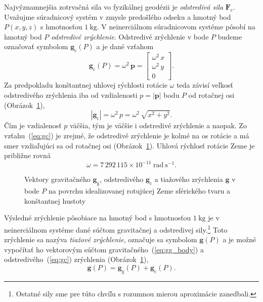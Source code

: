\documentclass[a4paper, 12pt]{book}
\newcommand{\gidx}{\mathrm g}
\newcommand{\cidx}{\mathrm c}
\let\vec\mathbf
\begin{document}
Najvýznamnejšia zotrvačná sila vo fyzikálnej geodézii je \emph{odstredivá sila} 
$\vec F_\cidx$.  Uvažujme súradnicový systém v zmysle predošlého odseku 
a hmotný bod $P(x, y, z)$ s hmotnosťou $1\ \mathrm{kg}$.  V neinerciálnom 
súradnicovom systéme pôsobí na hmotný bod $P$ \emph{odstredivé zrýchlenie}.  
Odstredivé zrýchlenie v bode $P$ budeme označovať symbolom $\vec g_\cidx(P)$ 
a je dané vzťahom
%
\begin{equation}
\label{eq:gc}
\vec g_\cidx(P) = \omega^2 \, \vec p =
%
\begin{bmatrix}
\omega^2 \, x\\
\omega^2 \, y\\
0
\end{bmatrix}
{.}
\end{equation}
%
Za predpokladu konštantnej uhlovej rýchlosti rotácie $\omega$ teda závisí 
veľkosť odstredivého zrýchlenia iba od vzdialenosti $p = | \vec p |$ bodu $P$ 
od rotačnej osi (Obrázok~\ref{fig:gravity_vector}),
%
\begin{equation}
| \vec g_\cidx | = \omega^2 \, p = \omega^2 \, \sqrt{x^2 + y^2}{.}
\end{equation}
%
Čím je vzdialenosť $p$ väčšia, tým je väčšie i odstredivé zrýchlenie a naopak.  
Zo vzťahu~(\ref{eq:gc}) je zrejmé, že odstredivé zrýchlenie je kolmé na os 
rotácie a má smer vzdiaľujúci sa od rotačnej osi 
(Obrázok~\ref{fig:gravity_vector}).  Uhlová rýchlosť rotácie Zeme je približne 
rovná \citep{GRS80}
%
\begin{equation}
\omega = 7\, 292\, 115 \times 10^{-11} \ \mathrm{rad} \ \mathrm{s}^{-1}{.}
\end{equation}

\begin{figure}
\centering

\caption{Vektory gravitačného $\vec g_\gidx$, odstredivého $\vec g_\cidx$ 
a tiažového zrýchlenia $\vec g$ v bode $P$ na povrchu idealizovanej rotujúcej 
Zeme sférického tvaru a konštantnej hustoty}
\label{fig:gravity_vector}
\end{figure}

Výsledné zrýchlenie pôsobiace na hmotný bod s hmotnosťou $1 \ \mathrm{kg}$ je 
v neinerciálnom systéme dané súčtom gravitačnej a odstredivej 
sily.\footnote{Ostatné sily sme pre túto chvíľu s rozumnou mierou aproximácie 
zanedbali.}  Toto zrýchlenie sa nazýva \emph{tiažové zrýchlenie}, označuje sa 
symbolom $\vec g(P)$ a je možné vypočítať ho vektorovým súčtom 
gravitačného~(\ref{eq:gg_body}) a odstredivého~(\ref{eq:gc}) zrýchlenia 
(Obrázok~\ref{fig:gravity_vector}),
%
\begin{equation}
\label{eq:g}
\vec g(P) = \vec g_\gidx(P) + \vec g_\cidx(P){.}
\end{equation}
\end{document}
